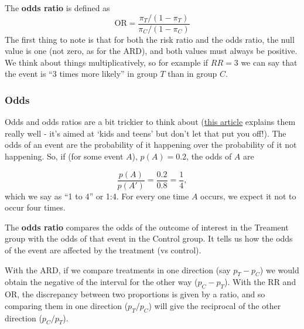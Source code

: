 \documentclass[
  openany]{book}
\theoremstyle{definition}
\theoremstyle{definition}
\theoremstyle{definition}
\theoremstyle{definition}
\theoremstyle{remark}
\begin{document}
The \textbf{odds ratio} is defined as
\[\text{OR} = \frac{\pi_T/\left(1-\pi_T\right)}{\pi_C/\left(1-\pi_C\right)}\]
The first thing to note is that for both the risk ratio and the odds ratio, the null value is one (not zero, as for the ARD), and both values must always be positive. We think about things multiplicatively, so for example if \(RR=3\) we can say that the event is ``3 times more likely'' in group \(T\) than in group \(C\).

\subsubsection*{Odds}\label{odds}

Odds and odds ratios are a bit trickier to think about (\href{https://kids.frontiersin.org/articles/10.3389/frym.2022.926624\#:~:text=As\%20an\%20example\%2C\%20if\%20the,disease\%20if\%20you\%20are\%20exposed.}{this article} explains them really well - it's aimed at `kids and teens' but don't let that put you off!). The odds of an event are the probability of it happening over the probability of it not happening. So, if (for some event \(A\)), \(p\left(A\right)=0.2\), the odds of \(A\) are

\[\frac{p\left(A\right)}{p\left(A'\right)} = \frac{0.2}{0.8} = \frac{1}{4}, \]
which we say as ``1 to 4'' or 1:4. For every one time \(A\) occurs, we expect it not to occur four times.

The \textbf{odds ratio} compares the odds of the outcome of interest in the Treament group with the odds of that event in the Control group. It tells us how the odds of the event are affected by the treatment (vs control).

With the ARD, if we compare treatments in one direction (say \(p_T - p_C\)) we would obtain the negative of the interval for the other way (\(p_C - p_T\)). With the RR and OR, the discrepancy between two proportions is given by a ratio, and so comparing them in one direction (\(p_T / p_C\)) will give the reciprocal of the other direction (\(p_C / p_T\)).
\end{document}
